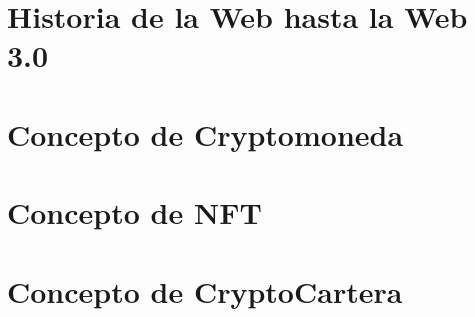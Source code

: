 \section{Historia de la Web hasta la Web 3.0}


\section{Concepto de Cryptomoneda}


\section{Concepto de NFT}


\section{Concepto de CryptoCartera}
